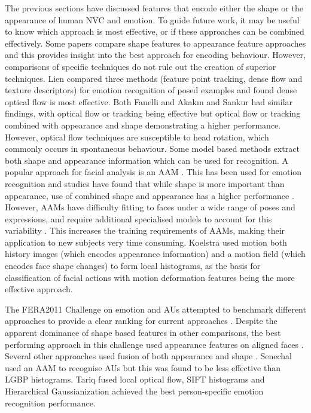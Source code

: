 The previous sections have discussed features that encode either the shape or the appearance of human \ac{NVC} and emotion. To guide future work, it may be useful to know which approach is most effective, or if these approaches can be combined effectively. Some papers compare shape features to appearance feature approaches and this provides insight into the best approach for encoding behaviour. However, comparisons of specific techniques do not rule out the creation of superior \featureGeneration techniques. Lien \cite{Lien1998a} compared three methods (feature point tracking, dense flow and texture descriptors) for emotion recognition of posed examples and found dense optical flow is most effective. Both Fanelli \etal \cite{Fanelli2010} and Akak{\i}n and Sankur \cite{Akakin2011} had similar findings, with optical flow or tracking being effective but optical flow or tracking combined with appearance and shape demonstrating a higher performance. However, optical flow techniques are susceptible to head rotation, which commonly occurs in spontaneous behaviour. Some model based methods extract both shape and appearance information which can be used for recognition. A popular approach for facial analysis is an \acf{AAM} \cite{Cootes1998}. This has been used for emotion recognition and studies have found that while shape is more important than appearance, use of combined shape and appearance has a higher performance \cite{Ashraf2007, Lucey2009}. However, \ac{AAM}s have difficulty fitting to faces under a wide range of poses and expressions, and require additional specialised models to account for this variability \cite{Peyras2008, Lee2009}. This increases the training requirements of \ac{AAM}s, making their application to new subjects very time consuming. Koelstra \etal \cite{Koelstra2010} used motion both history images (which encodes appearance information) and a motion field (which encodes face shape changes) to form local histograms, as the basis for classification of facial actions with motion deformation features being the more effective approach.


The FERA2011 Challenge on emotion and \ac{AU}s attempted to benchmark different approaches to provide a clear ranking for current approaches \cite{Valstar2011}. Despite the apparent dominance of shape based features in other comparisons, the best performing approach in this challenge used appearance features on aligned faces \cite{Yang2011}. Several other approaches used fusion of both appearance and shape \cite{Valstar2011slides, Valstar2012b}. Senechal \etal \cite{Senechal2012} used an \ac{AAM} to recognise \ac{AU}s but this was found to be less effective than \ac{LGBP} histograms. Tariq \etal \cite{Tariq2011} fused local optical flow, \ac{SIFT} histograms and Hierarchical Gaussianization achieved the best person-specific emotion recognition performance.

